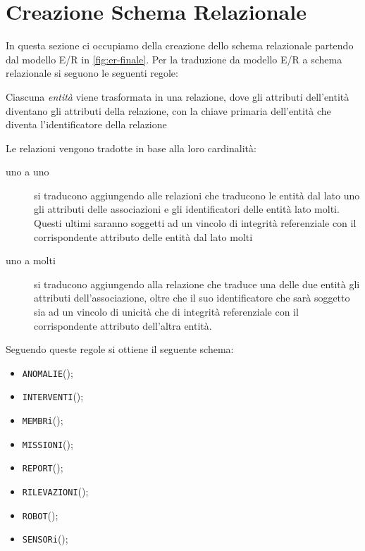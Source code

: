 \section{Creazione Schema Relazionale}
In questa sezione ci occupiamo della creazione dello schema relazionale partendo dal
modello E/R in \ref{fig:er-finale}. Per la traduzione da modello E/R a schema relazionale
si seguono le seguenti regole:
\begin{enumarate}
\item Ciascuna \textit{entità} viene trasformata in una relazione,
  dove gli attributi dell'entità diventano gli attributi della
  relazione, con la chiave primaria dell'entità che diventa
  l'identificatore della relazione
\item Le relazioni vengono tradotte in base alla loro cardinalità:
  \begin{description}
  \item[uno a uno] si traducono aggiungendo alle relazioni che traducono le entità dal lato uno gli
    attributi delle associazioni e gli identificatori delle entità lato molti. Questi ultimi saranno soggetti
    ad un vincolo di integrità referenziale con il corrispondente attributo delle entità dal lato molti
  \item[uno a molti] si traducono aggiungendo alla relazione che traduce una delle due entità gli attributi
    dell’associazione, oltre che il suo identificatore che sarà soggetto sia ad un vincolo di unicità
    che di integrità referenziale con il corrispondente attributo dell’altra entità.
  \end{description}
\end{enumarate}

Seguendo queste regole si ottiene il seguente schema:
\begin{itemize}
\item \texttt{ANOMALIE}();
\item \texttt{INTERVENTI}();
\item \texttt{MEMBRi}();
\item \texttt{MISSIONI}();
\item \texttt{REPORT}();
\item \texttt{RILEVAZIONI}();
\item \texttt{ROBOT}();
\item \texttt{SENSORi}();
\end{itemize}

